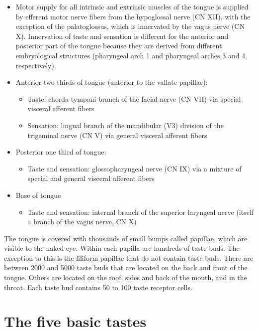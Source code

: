 \documentclass[]{book}
\providecommand{\tightlist}{%
  \setlength{\itemsep}{0pt}\setlength{\parskip}{0pt}}
\begin{document}
\begin{itemize}
\item
  Motor supply for all intrinsic and extrinsic muscles of the tongue is supplied by efferent motor nerve fibers from the hypoglossal nerve (CN XII), with the exception of the palatoglossus, which is innervated by the vagus nerve (CN X).
  Innervation of taste and sensation is different for the anterior and posterior part of the tongue because they are derived from different embryological structures (pharyngeal arch 1 and pharyngeal arches 3 and 4, respectively).
\item
  Anterior two thirds of tongue (anterior to the vallate papillae):

  \begin{itemize}
  \tightlist
  \item
    Taste: chorda tympani branch of the facial nerve (CN VII) via special visceral afferent fibers
  \item
    Sensation: lingual branch of the mandibular (V3) division of the trigeminal nerve (CN V) via general visceral afferent fibers
  \end{itemize}
\item
  Posterior one third of tongue:

  \begin{itemize}
  \tightlist
  \item
    Taste and sensation: glossopharyngeal nerve (CN IX) via a mixture of special and general visceral afferent fibers
  \end{itemize}
\item
  Base of tongue

  \begin{itemize}
  \tightlist
  \item
    Taste and sensation: internal branch of the superior laryngeal nerve (itself a branch of the vagus nerve, CN X)
  \end{itemize}
\end{itemize}

The tongue is covered with thousands of small bumps called papillae, which are visible to the naked eye. Within each papilla are hundreds of taste buds. The exception to this is the filiform papillae that do not contain taste buds. There are between 2000 and 5000 taste buds that are located on the back and front of the tongue. Others are located on the roof, sides and back of the mouth, and in the throat. Each taste bud contains 50 to 100 taste receptor cells.

\hypertarget{the-five-basic-tastes}{%
\section{The five basic tastes}\label{the-five-basic-tastes}}
\end{document}
